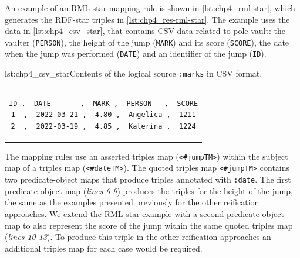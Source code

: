 An example of an \mbox{RML-star} mapping rule is shown in \cref{lst:chp4_rml-star}, which generates the \mbox{RDF-star} triples in \cref{lst:chp4_res-rml-star}.
The example uses the data in \cref{lst:chp4_csv_star}, that contains CSV data related to pole vault:
the vaulter (\texttt{PERSON}),
the height of the jump (\texttt{MARK}) and its score (\texttt{SCORE}),
the date when the jump was performed (\texttt{DATE}) and
an identifier of the jump (\texttt{ID}).

\noindent\hspace{0.15\linewidth}\begin{minipage}{\linewidth}
\begin{captionedlisting}{lst:chp4_csv_star}{Contents of the logical source \texttt{:marks} in CSV format.}
\centering
\begin{tabular}{c}
\hspace{3em}
{\begin{lstlisting}[basicstyle=\ttfamily\small,label={list:example1},columns=flexible]
ID ,  DATE       ,  MARK ,  PERSON   ,  SCORE
1  ,  2022-03-21 ,  4.80 ,  Angelica ,  1211
2  ,  2022-03-19 ,  4.85 ,  Katerina ,  1224
\end{lstlisting}}
\end{tabular}
\end{captionedlisting}
\end{minipage}

The mapping rules use an asserted triples map (\texttt{<\#jumpTM>}) within the subject map of a triples map (\texttt{<\#dateTM>}). The quoted triples map \texttt{<\#jumpTM>} contains two predicate-object maps that produce triples annotated with \texttt{:date}. The first predicate-object map (\textit{lines 6-9}) produces the triples for the height of the jump, the same as the examples presented previously for the other reification approaches. We extend the RML-star example with a second predicate-object map to also represent the score of the jump within the same quoted triples map (\textit{lines 10-13}). To produce this triple in the other reification approaches an additional triples map for each case would be required.




